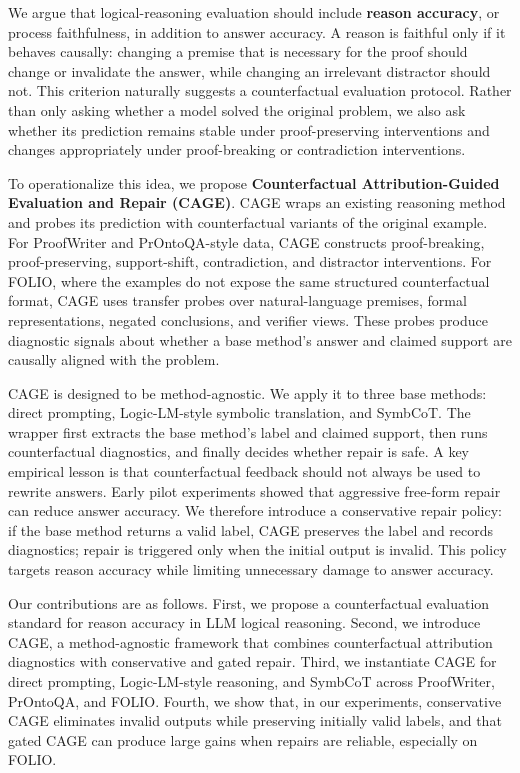 \documentclass{article}
\begin{document}
We argue that logical-reasoning evaluation should include \textbf{reason accuracy}, or process faithfulness, in addition to answer accuracy. A reason is faithful only if it behaves causally: changing a premise that is necessary for the proof should change or invalidate the answer, while changing an irrelevant distractor should not. This criterion naturally suggests a counterfactual evaluation protocol. Rather than only asking whether a model solved the original problem, we also ask whether its prediction remains stable under proof-preserving interventions and changes appropriately under proof-breaking or contradiction interventions.

To operationalize this idea, we propose \textbf{Counterfactual Attribution-Guided Evaluation and Repair (CAGE)}. CAGE wraps an existing reasoning method and probes its prediction with counterfactual variants of the original example. For ProofWriter and PrOntoQA-style data, CAGE constructs proof-breaking, proof-preserving, support-shift, contradiction, and distractor interventions. For FOLIO, where the examples do not expose the same structured counterfactual format, CAGE uses transfer probes over natural-language premises, formal representations, negated conclusions, and verifier views. These probes produce diagnostic signals about whether a base method's answer and claimed support are causally aligned with the problem.

CAGE is designed to be method-agnostic. We apply it to three base methods: direct prompting, Logic-LM-style symbolic translation, and SymbCoT. The wrapper first extracts the base method's label and claimed support, then runs counterfactual diagnostics, and finally decides whether repair is safe. A key empirical lesson is that counterfactual feedback should not always be used to rewrite answers. Early pilot experiments showed that aggressive free-form repair can reduce answer accuracy. We therefore introduce a conservative repair policy: if the base method returns a valid label, CAGE preserves the label and records diagnostics; repair is triggered only when the initial output is invalid. This policy targets reason accuracy while limiting unnecessary damage to answer accuracy.

Our contributions are as follows. First, we propose a counterfactual evaluation standard for reason accuracy in LLM logical reasoning. Second, we introduce CAGE, a method-agnostic framework that combines counterfactual attribution diagnostics with conservative and gated repair. Third, we instantiate CAGE for direct prompting, Logic-LM-style reasoning, and SymbCoT across ProofWriter, PrOntoQA, and FOLIO. Fourth, we show that, in our experiments, conservative CAGE eliminates invalid outputs while preserving initially valid labels, and that gated CAGE can produce large gains when repairs are reliable, especially on FOLIO.
\end{document}
